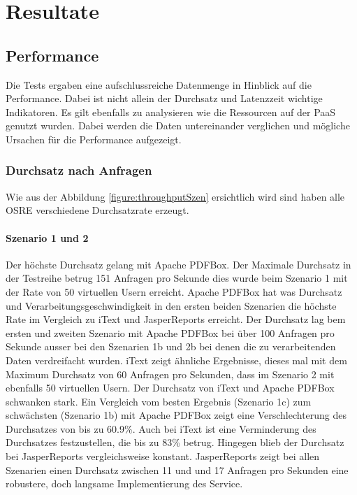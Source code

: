 \documentclass[main.tex]{subfiles}
\begin{document}
\chapter{Resultate} 

\section{Performance}
Die Tests ergaben eine aufschlussreiche Datenmenge in Hinblick auf die Performance. Dabei ist nicht allein der Durchsatz und Latenzzeit wichtige Indikatoren. Es gilt ebenfalls zu analysieren wie die Ressourcen auf der PaaS genutzt wurden. Dabei werden die Daten untereinander verglichen und mögliche Ursachen für die Performance aufgezeigt. 



\subsection{Durchsatz nach Anfragen}
Wie aus der Abbildung \ref{figure:throughputSzen} ersichtlich wird sind haben alle OSRE verschiedene Durchsatzrate erzeugt. 

\subsubsection{Szenario 1 und 2}
Der höchste Durchsatz gelang mit Apache PDFBox. Der Maximale Durchsatz in der Testreihe betrug 151 Anfragen pro Sekunde dies wurde beim Szenario 1 mit der Rate von 50 virtuellen Usern erreicht.  Apache PDFBox hat was Durchsatz und Verarbeitungsgeschwindigkeit in den ersten beiden Szenarien die höchste Rate im Vergleich zu iText und JasperReports erreicht. 
Der Durchsatz lag bem ersten und zweiten Szenario mit Apache PDFBox bei über 100 Anfragen pro Sekunde ausser bei den Szenarien 1b und 2b bei denen die zu verarbeitenden Daten verdreifacht wurden. 
iText zeigt ähnliche Ergebnisse, dieses mal mit dem Maximum Durchsatz von 60 Anfragen pro Sekunden, dass im Szenario 2 mit ebenfalls 50 virtuellen Usern. Der Durchsatz von iText und Apache PDFBox schwanken stark. Ein Vergleich vom besten Ergebnis (Szenario 1c) zum schwächsten (Szenario 1b) mit Apache PDFBox zeigt eine Verschlechterung des Durchsatzes von bis zu 60.9\%. Auch bei iText ist eine Verminderung des Durchsatzes festzustellen, die  bis zu 83\% betrug. Hingegen blieb der Durchsatz bei JasperReports vergleichsweise konstant. JasperReports zeigt bei allen Szenarien einen Durchsatz zwischen 11 und und 17 Anfragen pro Sekunden eine robustere, doch langsame Implementierung des Service.\newline 
\end{document}
